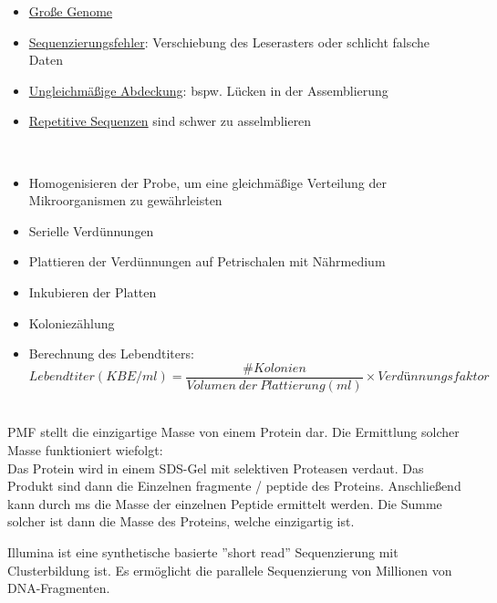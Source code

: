 \begin{itemize}
\item \underline{Große Genome}
    \item \underline{Sequenzierungsfehler}: Verschiebung des Leserasters oder schlicht falsche Daten 
    \item \underline{Ungleichmäßige Abdeckung}: bspw. Lücken in der Assemblierung
    \item \underline{Repetitive Sequenzen} sind schwer zu asselmblieren
\end{itemize} $\ $ \\

\begin{itemize}
    \item Homogenisieren der Probe, um eine gleichmäßige Verteilung der Mikroorganismen zu gewährleisten
    \item Serielle Verdünnungen
    \item Plattieren der Verdünnungen auf Petrischalen mit Nährmedium
    \item Inkubieren der Platten
    \item Koloniezählung
    \item Berechnung des Lebendtiters: 
    \begin{equation*}
        Lebendtiter (KBE/ml) = \frac{\# Kolonien}{Volumen \ der \ Plattierung (ml)} \times Verdünnungsfaktor
    \end{equation*}
\end{itemize} $\ $ \\

PMF stellt die einzigartige Masse von einem Protein dar. Die Ermittlung solcher Masse funktioniert wiefolgt: \\
Das Protein wird in einem SDS-Gel mit selektiven Proteasen verdaut. Das Produkt sind dann die Einzelnen fragmente / peptide des Proteins. Anschließend kann durch \gls{ms} die Masse der einzelnen Peptide ermittelt werden. Die Summe solcher ist dann die Masse des Proteins, welche einzigartig ist. \\ \newline


Illumina ist eine synthetische basierte ”short read” Sequenzierung mit Clusterbildung ist. Es ermöglicht die parallele Sequenzierung von Millionen von DNA-Fragmenten.
 \\ \newline

